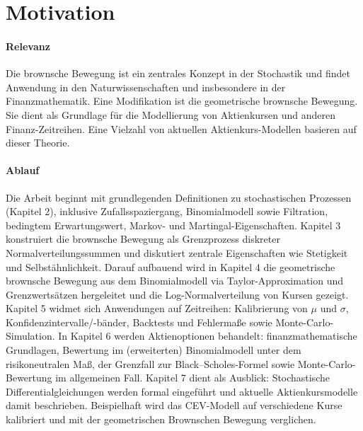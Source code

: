 \section{Motivation}

\paragraph{Relevanz}
Die brownsche Bewegung ist ein zentrales Konzept in der Stochastik und findet Anwendung in den Naturwissenschaften und insbesondere in der Finanzmathematik. Eine Modifikation ist die geometrische brownsche Bewegung. 
Sie dient als Grundlage für die Modellierung von Aktienkursen und anderen Finanz-Zeitreihen. Eine Vielzahl von
aktuellen Aktienkurs-Modellen basieren auf dieser Theorie.

\paragraph{Ablauf}
Die Arbeit beginnt mit grundlegenden Definitionen zu stochastischen Prozessen (Kapitel 2), inklusive Zufallsspaziergang, Binomialmodell sowie Filtration, 
bedingtem Erwartungswert, Markov- und Martingal-Eigenschaften. Kapitel 3 konstruiert die brownsche Bewegung 
als Grenzprozess diskreter Normalverteilungssummen und diskutiert zentrale Eigenschaften wie Stetigkeit und 
Selbstähnlichkeit. Darauf aufbauend wird in Kapitel 4 die geometrische brownsche Bewegung aus dem Binomialmodell 
via Taylor-Approximation und Grenzwertsätzen hergeleitet und die Log-Normalverteilung von Kursen gezeigt. 
Kapitel 5 widmet sich Anwendungen auf Zeitreihen: Kalibrierung von $\mu$ und $\sigma$, 
Konfidenzintervalle/-bänder, Backtests und Fehlermaße sowie Monte-Carlo-Simulation. In 
Kapitel 6 werden Aktienoptionen behandelt: finanzmathematische Grundlagen, Bewertung im 
(erweiterten) Binomialmodell unter dem risikoneutralen Maß, der Grenzfall zur Black–Scholes-Formel sowie 
Monte-Carlo-Bewertung im allgemeinen Fall. Kapitel 7 dient als Ausblick: Stochastische Differentialgleichungen werden formal eingeführt und
aktuelle Aktienkursmodelle damit beschrieben. Beispielhaft wird das CEV-Modell auf verschiedene Kurse kalibriert und mit der geometrischen
Brownschen Bewegung verglichen.
